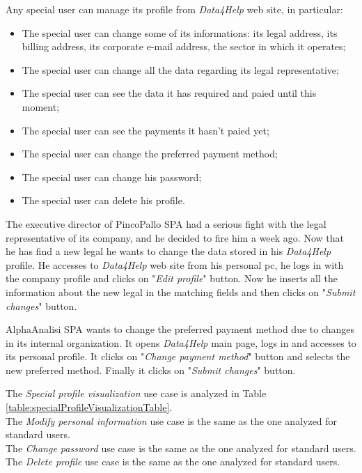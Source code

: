 Any special user can manage its profile from \textit{Data4Help} web site, in particular:
\begin{itemize}
  \item The special user can change some of its informations: its legal address, its billing address, its corporate e-mail address, the sector in which it operates;
  \item The special user can change all the data regarding its legal representative;
  \item The special user can see the data it has required and paied until this moment;
  \item The special user can see the payments it hasn't paied yet;
  \item The special user can change the preferred payment method;
  \item The special user can change his password;
  \item The special user can delete his profile.
\end{itemize}

The executive director of PincoPallo SPA had a serious fight with the legal representative of its company, and he decided to fire him a week ago. Now that he has find a new legal he wants to change the data stored in his \textit{Data4Help} profile. He accesses to \textit{Data4Help} web site from his personal pc, he logs in with the company profile and clicks on "\textit{Edit profile}" button. Now he inserts all the information about the new legal in the matching fields and then clicks on "\textit{Submit changes}" button.

AlphaAnalisi SPA wants to change the preferred payment method due to changes in its internal organization. It opens \textit{Data4Help} main page, logs in and accesses to its personal profile. It clicks on "\textit{Change payment method}" button and selects the new preferred method. Finally it clicks on "\textit{Submit changes}" button.

The \textit{Special profile visualization} use case is analyzed in Table \ref{table:specialProfileVisualizationTable}. \\
The \textit{Modify personal information} use case is the same as the one analyzed for standard users. \\
The \textit{Change password} use case is the same as the one analyzed for standard users. \\
The \textit{Delete profile} use case is the same as the one analyzed for standard users. \\

